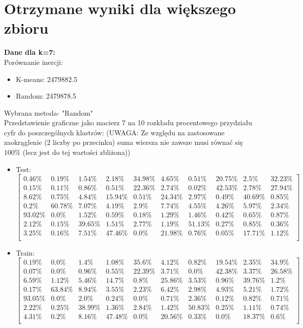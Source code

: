 \documentclass[a4paper,14pt]{report}
\begin{document}
\section{Otrzymane wyniki dla większego zbioru}
	\textbf{Dane dla k=7: } \\
	Porównanie inercji: 
	\begin{itemize}
		\item K-means: 2479882.5
		\item Random: 2479878.5
	\end{itemize}
	Wybrana metoda- "Random" \\
	Przedstawienie graficzne jako macierz 7 na 10 rozkładu procentowego przydziału cyfr do poszczególnych klastrów:
	(UWAGA: Ze względu na zastosowane zaokrąglenie (2 liczby po przecinku) suma wiersza nie zawsze musi równać się $100\%$ (lecz jest do tej wartości zbliżona))
	\begin{itemize}
		\item Test:
		$
		\begin{bmatrix}
		0.46\% & 0.19\% & 1.54\% & 2.18\% & 34.98\% & 4.65\% & 0.51\% & 20.75\% & 2.5\% & 32.23\% \\ 
		0.15\% & 0.11\% & 0.86\% & 0.51\% & 22.36\% & 2.74\% & 0.02\% & 42.53\% & 2.78\% & 27.94\% \\ 
		8.62\% & 0.75\% & 4.84\% & 15.94\% & 0.51\% & 24.34\% & 2.97\% & 0.49\% & 40.69\% & 0.85\% \\
		0.2\% & 60.78\% & 7.07\% & 4.19\% & 2.9\% & 7.74\% & 4.55\% & 4.26\% & 5.97\% & 2.34\% \\ 
		93.02\% & 0.0\% & 1.52\% & 0.59\% & 0.18\% & 1.29\% & 1.46\% & 0.42\% & 0.65\% & 0.87\% \\ 
		2.12\% & 0.15\% & 39.65\% & 1.51\% & 2.77\% & 1.19\% & 51.13\% & 0.27\% & 0.85\% & 0.36\% \\ 
		3.25\% & 0.16\% & 7.51\% & 47.46\% & 0.0\% & 21.98\% & 0.76\% & 0.05\% & 17.71\% & 1.12\% \\
		\end{bmatrix} 
		$
		\item Train:
		$
		\begin{bmatrix}
		0.19\% & 0.0\% & 1.4\% & 1.08\% & 35.6\% & 4.12\% & 0.82\% & 19.54\% & 2.35\% & 34.9\% \\
		0.07\% & 0.0\% & 0.96\% & 0.55\% & 22.39\% & 3.71\% & 0.0\% & 42.38\% & 3.37\% & 26.58\% \\ 
		6.59\% & 1.12\% & 5.46\% & 14.7\% & 0.8\% & 25.86\% & 3.53\% & 0.96\% & 39.76\% & 1.2\% \\ 
		0.17\% & 63.84\% & 8.94\% & 3.55\% & 2.23\% & 6.42\% & 2.98\% & 4.93\% & 5.21\% & 1.72\% \\ 
		93.05\% & 0.0\% & 2.0\% & 0.24\% & 0.0\% & 0.71\% & 2.36\% & 0.12\% & 0.82\% & 0.71\% \\ 
		2.22\% & 0.25\% & 38.99\% & 1.36\% & 2.84\% & 1.42\% & 50.83\% & 0.25\% & 1.11\% & 0.74\% \\ 
		4.31\% & 0.2\% & 8.16\% & 47.48\% & 0.0\% & 20.56\% & 0.33\% & 0.0\% & 18.37\% & 0.6\% \\
		\end{bmatrix} 
		$
	\end{itemize}
\end{document}
